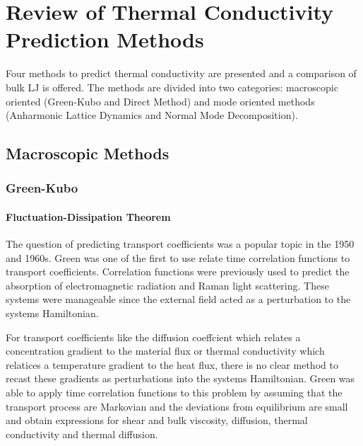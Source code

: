 \chapter{Review of Thermal Conductivity Prediction Methods}

Four methods to predict thermal conductivity are presented and a comparison of bulk LJ is offered. The methods are divided into two categories: macroscopic oriented (Green-Kubo and Direct Method) and mode oriented methods (Anharmonic Lattice Dynamics and Normal Mode Decomposition).

\section{Macroscopic Methods}
\subsection{Green-Kubo}
\subsubsection{Fluctuation-Dissipation Theorem}

The question of predicting transport coefficients was a popular topic in the 1950 and 1960s. Green was one of the first to use relate time correlation functions to transport coefficients. \cite{green1954markoff} Correlation functions were previously used to predict the absorption of electromagnetic radiation \cite{gordon1968correlation} and Raman light scattering. \cite{gordon1965molecular} These systems were manageable since the external field acted as a perturbation to the systems Hamiltonian.

For transport coefficients like the diffusion coeffcient which relates a concentration gradient to the material flux or thermal conductivity which relatices a temperature gradient to the heat flux, there is no clear method to recast these gradients as perturbations into the systems Hamiltonian. \cite {mcquarrier} Green was able to apply time correlation functions to this problem by assuming that the transport process are Markovian and the deviations from equilibrium are small \cite{green1954markoff} and obtain expressions for shear and bulk viscosity, diffusion, thermal conductivity and thermal diffusion.

